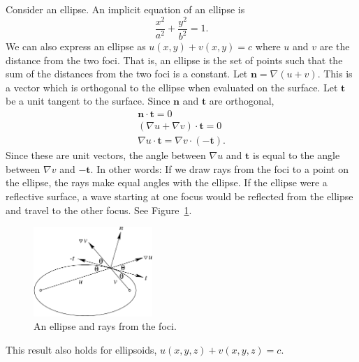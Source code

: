 \begin{Example}
  Consider an ellipse.  An implicit equation of an ellipse is
  \[
  \frac{x^2}{a^2} + \frac{y^2}{b^2} = 1.
  \]
  We can also express an ellipse as $u(x,y) + v(x,y) = c$ 
  where $u$ and $v$ are the distance from the two foci.  That is, an ellipse 
  is the set of points such that the sum of the distances from the two foci is 
  a constant.  Let $\mathbf{n} = \nabla(u + v)$.  This is a vector which
  is orthogonal to the ellipse when evaluated on the surface.  Let $\mathbf{t}$
  be a unit tangent to the surface.  Since $\mathbf{n}$ and $\mathbf{t}$ are
  orthogonal,
  \begin{gather*}
    \mathbf{n} \cdot \mathbf{t} = 0 \\
    (\nabla u + \nabla v) \cdot \mathbf{t} = 0 \\
    \nabla u \cdot \mathbf{t} = \nabla v \cdot (- \mathbf{t}).
  \end{gather*}
  Since these are unit vectors, the angle between $\nabla u$ and $\mathbf{t}$
  is equal to the angle between $\nabla v$ and $-\mathbf{t}$.  In other
  words: If we draw rays from the foci to a point on the ellipse, the rays 
  make equal angles with the ellipse.   If the ellipse were a reflective 
  surface, a wave starting at one focus would be reflected from the ellipse and 
  travel to the other focus.  See Figure~\ref{ellipse and rays}.
  \begin{figure}[h!]
    \begin{center}
      \includegraphics[width=0.4\textwidth]{calculus/vector/ellipse}
    \end{center}
    \caption{An ellipse and rays from the foci.}
    \label{ellipse and rays}
  \end{figure}
  This result also holds for ellipsoids, $u(x,y, z) + v(x,y, z) = c$. 


\end{Example}
